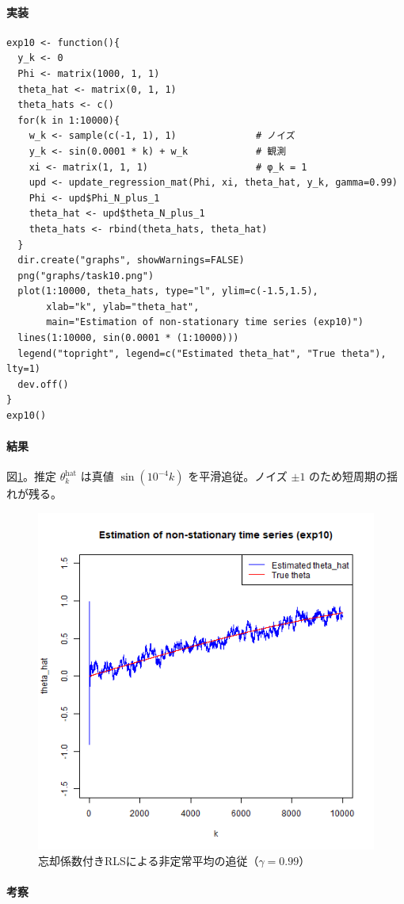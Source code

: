 \paragraph{実装}
\begin{lstlisting}
exp10 <- function(){
  y_k <- 0
  Phi <- matrix(1000, 1, 1)
  theta_hat <- matrix(0, 1, 1)
  theta_hats <- c()
  for(k in 1:10000){
    w_k <- sample(c(-1, 1), 1)              # ノイズ
    y_k <- sin(0.0001 * k) + w_k            # 観測
    xi <- matrix(1, 1, 1)                   # φ_k = 1
    upd <- update_regression_mat(Phi, xi, theta_hat, y_k, gamma=0.99)
    Phi <- upd$Phi_N_plus_1
    theta_hat <- upd$theta_N_plus_1
    theta_hats <- rbind(theta_hats, theta_hat)
  }
  dir.create("graphs", showWarnings=FALSE)
  png("graphs/task10.png")
  plot(1:10000, theta_hats, type="l", ylim=c(-1.5,1.5),
       xlab="k", ylab="theta_hat",
       main="Estimation of non-stationary time series (exp10)")
  lines(1:10000, sin(0.0001 * (1:10000)))
  legend("topright", legend=c("Estimated theta_hat", "True theta"), lty=1)
  dev.off()
}
exp10()
\end{lstlisting}

\paragraph{結果}
図\ref{fig:task10}。推定 $\theta_k^{\text{hat}}$ は真値 $\sin(10^{-4}k)$ を平滑追従。ノイズ $\pm 1$ のため短周期の揺れが残る。

\begin{figure}[H]
  \centering
  \includegraphics[width=.82\linewidth]{graphs/task10.png}
  \caption{忘却係数付きRLSによる非定常平均の追従（$\gamma=0.99$）}
  \label{fig:task10}
\end{figure}

\paragraph{考察}

